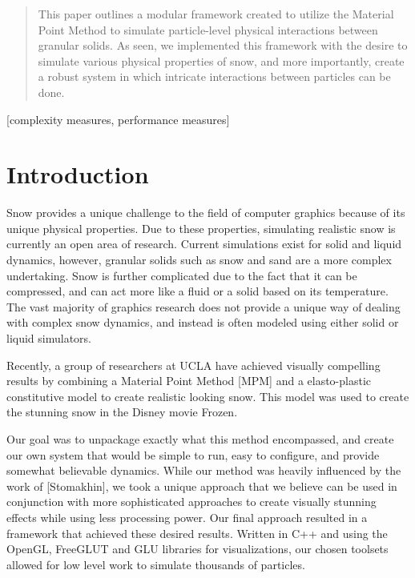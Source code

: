 \documentclass{acm_proc_article-sp}
\begin{document}
\maketitle
\begin{abstract}
This paper outlines a modular framework created to utilize the Material Point Method to simulate particle-level physical interactions between granular solids. As seen, we implemented this framework with the desire to simulate various physical properties of snow, and more importantly, create a robust system in which intricate interactions between particles can be done. 
\end{abstract}

[complexity measures, performance measures]



\section{Introduction}
Snow provides a unique challenge to the field of computer graphics because of its unique physical properties. Due to these properties, simulating realistic snow is currently an open area of research. Current simulations exist for solid and liquid dynamics, however, granular solids such as snow and sand are a more complex undertaking. Snow is further complicated due to the fact that it can be compressed, and can act more like a fluid or a solid based on its temperature. The vast majority of graphics research does not provide a unique way of dealing with complex snow dynamics, and instead is often modeled using either solid or liquid simulators.

Recently, a group of researchers at UCLA have achieved visually compelling results by combining a Material Point Method [MPM] and a elasto-plastic constitutive model to create realistic looking snow. This model was used to create the stunning snow in the Disney movie Frozen. 

Our goal was to unpackage exactly what this method encompassed, and create our own system that would be simple to run, easy to configure, and provide somewhat believable dynamics. While our method was heavily influenced by the work of [Stomakhin], we took a unique approach that we believe can be used in conjunction with more sophisticated approaches to create visually stunning effects while using less processing power. Our final approach resulted in a framework that achieved these desired results. Written in C++ and using the OpenGL, FreeGLUT and GLU libraries for visualizations, our chosen toolsets allowed for low level work to simulate thousands of particles.
\end{document}
